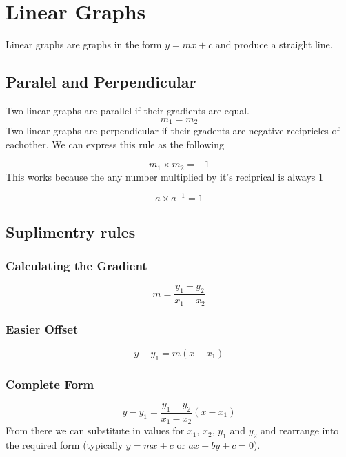\documentclass{article}
\begin{document}
\section{Linear Graphs}
Linear graphs are graphs in the form $y = mx + c$ and produce a straight line.

\subsection{Paralel and Perpendicular}
Two linear graphs are parallel if their gradients are equal.
\begin{equation}
	m_1 = m_2
\end{equation}
Two linear graphs are perpendicular if their gradents are negative recipricles of eachother. We can express this rule as the following

\begin{equation}
	m_1 \times m_2 = -1
\end{equation}
This works because the any number multiplied by it's reciprical is always $1$

\begin{equation}
	a \times a^{-1} = 1
\end{equation}

\subsection{Suplimentry rules}

\subsubsection{Calculating the Gradient}

\begin{equation}
	m = \frac{y_1 - y_2}{x_1 - x_2}
\end{equation}

\subsubsection{Easier Offset}

\begin{equation}
	y - y_1 = m(x - x_1)
\end{equation}

\subsubsection{Complete Form}

\begin{equation}
	y - y_1 = \frac{y_1 - y_2}{x_1 - x_2}(x - x_1)
\end{equation}
From there we can substitute in values for $x_1$, $x_2$, $y_1$ and $y_2$ and rearrange into the required form
(typically $y=mx+c$ or $ax + by + c = 0$).
\end{document}
